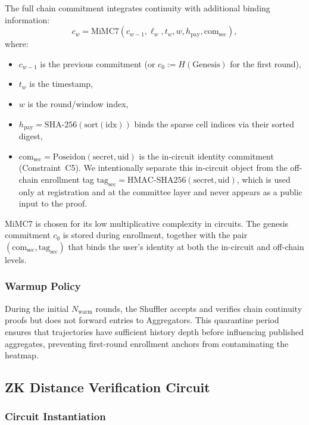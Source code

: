 \documentclass[conference]{IEEEtran}
\theoremstyle{definition}
\theoremstyle{plain}
\begin{document}
The full chain commitment integrates continuity with additional binding information:
\begin{equation}
c_w = \mathrm{MiMC7}(c_{w-1}, \ell_w, t_w, w, h_{\mathrm{pay}}, \mathrm{com}_{\mathrm{sec}}),
\end{equation}
where:
\begin{itemize}
\item $c_{w-1}$ is the previous commitment (or $c_0 := H(\mathrm{Genesis})$ for the first round),
\item $t_w$ is the timestamp,
\item $w$ is the round/window index,
\item $h_{\mathrm{pay}} = \mathrm{SHA}\text{-}256(\mathrm{sort}(\mathrm{idx}))$ binds the sparse cell indices via their sorted digest,
\item $\mathrm{com}_{\mathrm{sec}} = \mathrm{Poseidon}(\mathrm{secret}, \mathrm{uid})$ is the in-circuit identity commitment (Constraint~C5). We intentionally separate this in-circuit object from the off-chain enrollment tag $\mathrm{tag}_{\mathrm{sec}} = \mathrm{HMAC\text{-}SHA256}(\mathrm{secret}, \mathrm{uid})$, which is used only at registration and at the committee layer and never appears as a public input to the proof.
\end{itemize}

MiMC7 is chosen for its low multiplicative complexity in circuits. The genesis commitment $c_0$ is stored during enrollment, together with the pair $(\mathrm{com}_{\mathrm{sec}}, \mathrm{tag}_{\mathrm{sec}})$ that binds the user's identity at both the in-circuit and off-chain levels.

\subsubsection{Warmup Policy}

During the initial $N_{\mathrm{warm}}$ rounds, the Shuffler accepts and verifies chain continuity proofs but does not forward entries to Aggregators. This quarantine period ensures that trajectories have sufficient history depth before influencing published aggregates, preventing first-round enrollment anchors from contaminating the heatmap.

\subsection{ZK Distance Verification Circuit}\label{sec:circuit}

\subsubsection{Circuit Instantiation}
\end{document}
